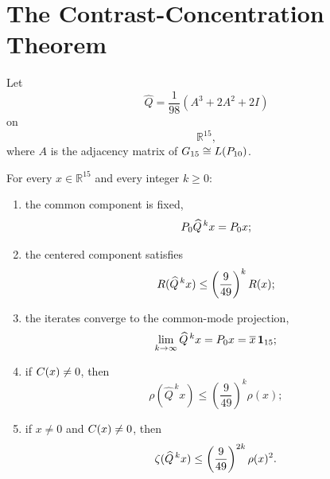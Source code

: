 \section{The Contrast-Concentration Theorem}

\begin{theorem}
Let
\[
\widehat{Q}
=
\frac{1}{98}
\left(A^3+2A^2+2I\right)
\]
on
\[
\mathbb R^{15},
\]
where \(A\) is the adjacency matrix of
\(G_{15}\cong L(P_{10})\).

For every \(x\in\mathbb R^{15}\) and every integer \(k\ge0\):

\begin{enumerate}[label=(\roman*)]
\item the common component is fixed,
\[
P_{0}\widehat{Q}^{\,k}x
=
P_{0} x;
\]

\item the centered component satisfies
\[
R(\widehat{Q}^{\,k}x)
\le
\left(\frac{9}{49}\right)^k
R(x);
\]

\item the iterates converge to the common-mode projection,
\[
\lim_{k\to\infty}
\widehat{Q}^{\,k}x
=
P_{0} x
=
\overline{x}\,\mathbf{1}_{15};
\]

\item if \(C(x)\neq0\), then
\[
\rho(\widehat{Q}^{\,k}x)
\le
\left(\frac{9}{49}\right)^k
\rho(x);
\]

\item if \(x\neq0\) and \(C(x)\neq0\), then
\[
\zeta(\widehat{Q}^{\,k}x)
\le
\left(\frac{9}{49}\right)^{2k}
\rho(x)^2.
\]
\end{enumerate}
\end{theorem}

